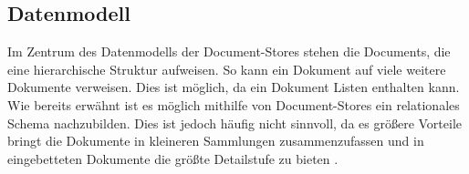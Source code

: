 \subsection{Datenmodell}
Im Zentrum des Datenmodells der Document-Stores stehen die Documents, die eine hierarchische Struktur aufweisen. So kann ein Dokument auf viele weitere Dokumente verweisen. Dies ist möglich, da ein Dokument Listen enthalten kann. 
\\

Wie bereits erwähnt ist es möglich mithilfe von Document-Stores ein relationales Schema nachzubilden. Dies ist jedoch häufig nicht sinnvoll, da es größere Vorteile bringt die Dokumente in kleineren Sammlungen zusammenzufassen und in eingebetteten Dokumente die größte Detailstufe zu bieten \cite{harrison01}. 
\\

